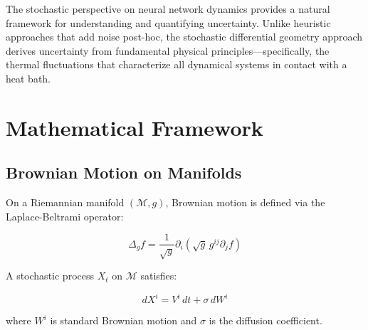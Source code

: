 \documentclass[12pt,a4paper]{article}
\begin{document}
The stochastic perspective on neural network dynamics provides a natural framework for understanding and quantifying uncertainty. Unlike heuristic approaches that add noise post-hoc, the stochastic differential geometry approach derives uncertainty from fundamental physical principles—specifically, the thermal fluctuations that characterize all dynamical systems in contact with a heat bath.

\section{Mathematical Framework}

\subsection{Brownian Motion on Manifolds}

On a Riemannian manifold $(\mathcal{M}, g)$, Brownian motion is defined via the Laplace-Beltrami operator:

\begin{equation}
\Delta_g f = \frac{1}{\sqrt{g}} \partial_i\left(\sqrt{g} \, g^{ij} \partial_j f\right)
\end{equation}

A stochastic process $X_t$ on $\mathcal{M}$ satisfies:

\begin{equation}
dX^i = V^i \, dt + \sigma \, dW^i
\end{equation}

where $W^i$ is standard Brownian motion and $\sigma$ is the diffusion coefficient.
\end{document}
